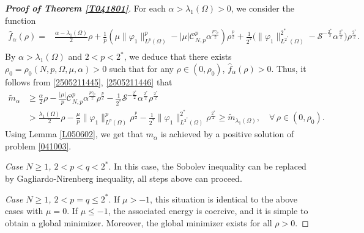 \documentclass[10pt,a4paper]{amsart}
\begin{document}
\begin{proof}[\bf Proof of Theorem \ref{T041801}]
For each $\alpha>\lambda_1(\Omega)>0$, we consider the function
\begin{equation*}
\begin{aligned}
\hat{f}_{\alpha}(\rho)
=&\frac{\alpha-\lambda_1(\Omega)}{2}\rho
+{\frac{1}{p}\left(\mu\|\varphi_1\|^p_{L^{p}(\Omega)}-|\mu|\mathcal{C}^{p}_{N,p}\alpha^{\frac{p\gamma_{p}}{2}}\right)\rho^{\frac{p}{2}}}
+\frac{1}{2^{*}}\big(\|\varphi_1\|^{2^{*}}_{L^{2^{*}}(\Omega)}
-\mathcal{S}^{-\frac{2^{*}}{2}}\alpha^{\frac{2^{*}}{2}}\big)\rho^{\frac{2^{*}}{2}}.\\
\end{aligned}
\end{equation*}
By $\alpha>\lambda_1(\Omega)$ and $2<p<2^*$, we deduce that there exists $\rho_0=\rho_0(N,p,\Omega, \mu, \alpha)>0$ such that  for any $\rho\in(0,\rho_0)$, $\hat{f}_{\alpha}(\rho)>0$.
Thus, it follows from \eqref{2505211445}, \eqref{2505211446} that
\begin{equation*}
\begin{aligned}
\widetilde{m}_{\alpha}
&\geq
\frac{\alpha}{2}\rho
-\frac{|\mu|}{p}\mathcal{C}^{p}_{N,p}\alpha^{\frac{p\gamma_{p}}{2}}\rho^{\frac{p}{2}}
-\frac{1}{2^{*}}\mathcal{S}^{-\frac{2^{*}}{2}}\alpha^{\frac{2^{*}}{2}}\rho^{\frac{2^{*}}{2}}\\
&>\frac{\lambda_1(\Omega)}{2}\rho
-\frac{\mu}{p}\|\varphi_1\|^p_{L^{p}(\Omega)}\rho^{\frac{p}{2}}
-\frac{1}{2^{*}}\|\varphi_1\|^{2^{*}}_{L^{2^{*}}(\Omega)}\rho^{\frac{2^{*}}{2}}
\geq\widetilde{m}_{\lambda_1(\Omega)},\quad \forall\,\rho\in(0,\rho_0).
\end{aligned}
\end{equation*}
Using Lemma \ref{L050602}, we get that $m_{\alpha}$ is achieved by a positive solution of problem \eqref{041003}.

\smallskip
{\it Case $N\ge 1$, $2<p<q<2^*$}. In this case,  the Sobolev inequality can be replaced by Gagliardo-Nirenberg inequality, all steps above can proceed.

\smallskip
{\it Case $N\ge 1$, $2<p=q\le 2^*$}. If $\mu>-1$,  this situation is identical to the above cases with $\mu=0$. If $\mu\le -1$, the associated energy is coercive, and it is simple to obtain a global minimizer. Moreover, the global minimizer exists for all $\rho>0$.
\end{proof}
\end{document}
